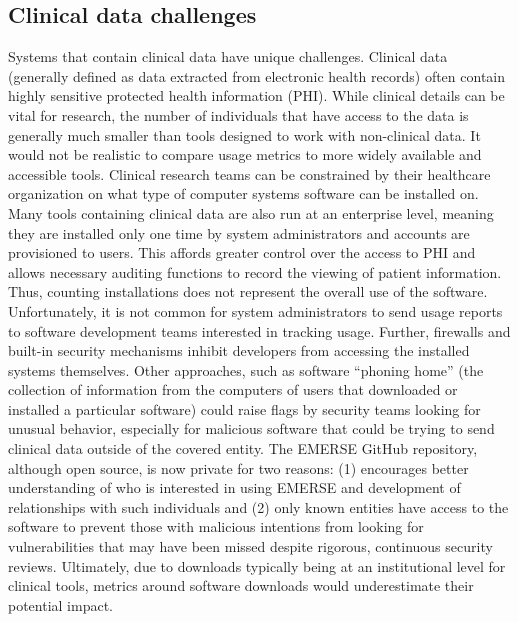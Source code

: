 \documentclass{article}
\begin{document}
\subsection{Clinical data challenges}

Systems that contain clinical data have unique challenges.  Clinical data (generally defined as data extracted from electronic health records) often contain highly sensitive protected health information (PHI). While clinical details can be vital for research, the number of individuals that have access to the data is generally much smaller than tools designed to work with non-clinical data. It would not be realistic to compare usage metrics to more widely available and accessible tools. Clinical research teams can be constrained by their healthcare organization on what type of computer systems software can be installed on. Many tools containing clinical data are also run at an enterprise level, meaning they are installed only one time by system administrators and accounts are provisioned to users. This affords greater control over the access to PHI and allows necessary auditing functions to record the viewing of patient information.  Thus, counting installations does not represent the overall use of the software. Unfortunately, it is not common for system administrators to send usage reports to software development teams interested in tracking usage.  Further, firewalls and built-in security mechanisms inhibit developers from accessing the installed systems themselves. Other approaches, such as software “phoning home” (the collection of information from the computers of users that downloaded or installed a particular software) could raise flags by security teams looking for unusual behavior, especially for malicious software that could be trying to send clinical data outside of the covered entity. The EMERSE \cite{hanauer_supporting_2015} GitHub repository, although open source, is now private for two reasons: (1) encourages  better understanding of who is interested in using EMERSE and development of relationships with such individuals and (2)  only known entities have access to the software to prevent those with malicious intentions from looking for vulnerabilities that may have been missed despite rigorous, continuous security reviews.  Ultimately, due to downloads typically being at an institutional level for clinical tools, metrics around software downloads would underestimate their potential impact.  
\end{document}
